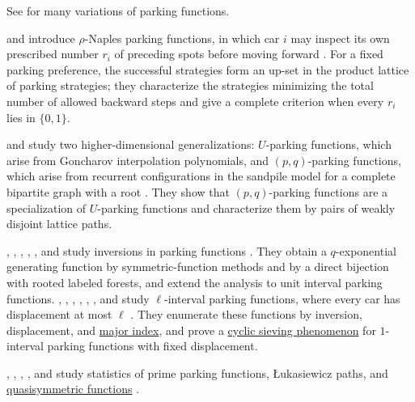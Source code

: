 See \cite{CarlsonChristensenHarrisJonesRodriguez2021} for many variations of parking functions.

 and  introduce
$\rho$-Naples parking functions, in which car $i$ may inspect its own
prescribed number $r_i$ of preceding spots before moving forward
\cite{FerrariVerciani2026x}.  For a fixed parking preference, the successful
strategies form an up-set in the product lattice of parking strategies; they
characterize the strategies minimizing the total number of allowed backward
steps and give a complete criterion when every $r_i$ lies in $\{0,1\}$.

 and  study two higher-dimensional
generalizations: $U$-parking functions, which arise from Goncharov
interpolation polynomials, and $(p,q)$-parking functions, which arise from
recurrent configurations in the sandpile model for a complete bipartite graph
with a root \cite{SniderYan2022}.  They show that $(p,q)$-parking functions
are a specialization of $U$-parking functions and characterize them by pairs
of weakly disjoint lattice paths.

, , ,
, , and 
study inversions in parking functions \cite{CelanoElderHadawayHarrisPriestleyUdell2025x}.
They obtain a $q$-exponential generating function by symmetric-function
methods and by a direct bijection with rooted labeled forests, and extend the
analysis to unit interval parking functions.
, , ,
, , ,
and  study $\ell$-interval parking functions, where every
car has displacement at most $\ell$
\cite{CelanoElderHadawayHarrisMartinPriestleyUdell2025x}.  They enumerate
these functions by inversion, displacement, and \hyperref[majorIndex]{major
index}, and prove a
\hyperref[cyclicSieving]{cyclic sieving phenomenon} for $1$-interval parking
functions with fixed displacement.

, , ,
, and  study statistics of prime parking
functions, {\L}ukasiewicz paths, and
\hyperref[quasiSymmetricFunctions]{quasisymmetric functions}
\cite{HarrisKaraMcNicholasNymanYin2026x}.
